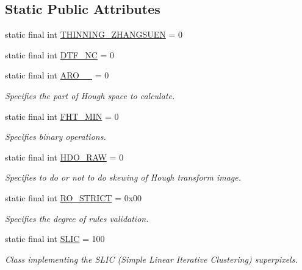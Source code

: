 \subsection*{Static Public Attributes}
\begin{DoxyCompactItemize}
\item 
static final int \hyperlink{classorg_1_1bytedeco_1_1javacpp_1_1opencv__ximgproc_a72f55e80b08dbd86f39919d518fda4fd}{T\+H\+I\+N\+N\+I\+N\+G\+\_\+\+Z\+H\+A\+N\+G\+S\+U\+EN} = 0
\item 
static final int \hyperlink{group__ximgproc__filters_ga23e2b57a77b596c717a878099310808e}{D\+T\+F\+\_\+\+NC} = 0
\item 
static final int \hyperlink{classorg_1_1bytedeco_1_1javacpp_1_1opencv__ximgproc_a6ed38d0dcc0c7f6bc43bba246c808e68}{A\+R\+O\+\_\+\_} = 0
\begin{DoxyCompactList}\small\item\em Specifies the part of Hough space to calculate. \end{DoxyCompactList}\item 
static final int \hyperlink{classorg_1_1bytedeco_1_1javacpp_1_1opencv__ximgproc_a59bbfb5aee70839b4d80fa69ed463326}{F\+H\+T\+\_\+\+M\+IN} = 0
\begin{DoxyCompactList}\small\item\em Specifies binary operations. \end{DoxyCompactList}\item 
static final int \hyperlink{classorg_1_1bytedeco_1_1javacpp_1_1opencv__ximgproc_af143ef22057c2fb15ae3cf5d6c55e484}{H\+D\+O\+\_\+\+R\+AW} = 0
\begin{DoxyCompactList}\small\item\em Specifies to do or not to do skewing of Hough transform image. \end{DoxyCompactList}\item 
static final int \hyperlink{classorg_1_1bytedeco_1_1javacpp_1_1opencv__ximgproc_a672ff08a885adecc6dfdab8968e4c369}{R\+O\+\_\+\+S\+T\+R\+I\+CT} = 0x00
\begin{DoxyCompactList}\small\item\em Specifies the degree of rules validation. \end{DoxyCompactList}\item 
static final int \hyperlink{group__ximgproc__superpixel_gad6647d487c2dfbf08f2a26f408f020c3}{S\+L\+IC} = 100
\begin{DoxyCompactList}\small\item\em Class implementing the S\+L\+IC (Simple Linear Iterative Clustering) superpixels. \end{DoxyCompactList}\end{DoxyCompactItemize}


